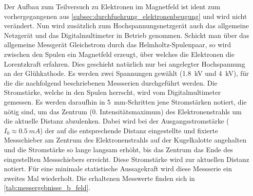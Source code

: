 \documentclass[ngerman]{scrartcl}
\begin{document}
Der Aufbau zum Teilversuch zu Elektronen im Magnetfeld ist ident zum vorhergegangenen aus \autoref{subsec:durchfuehrung_elektronenbeugung} und wird nicht verändert. Nun wird zusätzlich zum Hochspannungsnetzgerät auch das allgemeine Netzgerät und das Digitalmultimeter in Betrieb genommen. Schickt man über das allgemeine Messgerät Gleichstrom
durch das Helmholtz-Spulenpaar, so wird zwischen den Spulen ein Magnetfeld erzeugt, über welches die Elektronen die Lorentzkraft erfahren. Dies geschieht natürlich nur bei angelegter Hochspannung an der Glühkathode. Es werden zwei Spannungen gewählt (\SI{1.8}{kV} und \SI{4}{kV}), für die die nachfolgend beschriebenen Messserien durchgeführt werden. Die Stromstärke, welche in den Spulen herrscht, wird vom Digitalmultimeter gemessen. Es werden daraufhin in \SI{5}{mm}-Schritten jene Stromstärken notiert, die nötig sind, um das Zentrum (0. Intensitätsmaximum) des Elektronenstrahls um die aktuelle Distanz abzulenken. Dabei wird bei der Ausgangsstromstärke ($I_0 \approx \SI{0.5}{mA}$) der auf die entsprechende Distanz eingestellte und fixierte Messschieber am Zentrum des Elektronenstrahls auf der Kugelkalotte angehalten und die Stromstärke so lange langsam erhöht, bis das Zentrum das Ende des eingestellten Messschiebers erreicht. Diese Stromstärke wird zur aktuellen Distanz notiert. Für eine minimale statistische Aussagekraft wird diese Messserie ein zweites Mal wiederholt. Die erhaltenen Messwerte finden sich in \autoref{tab:messergebnisse_b_feld}.
%
\end{document}
